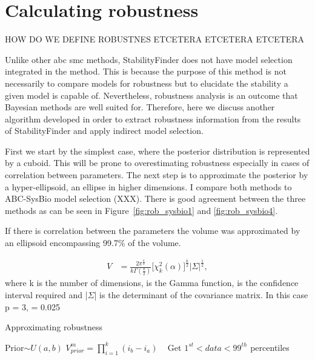 {\section{Calculating robustness}


{\color{red}HOW DO WE DEFINE ROBUSTNES ETCETERA ETCETERA ETCETERA }

Unlike other \acrshort{abc} \acrshort{smc} methods, StabilityFinder does not have model selection integrated in the method. This is because the purpose of this method is not necessarily to compare models for robustness but to elucidate the stability a given model is capable of. Nevertheless, robustness analysis is an outcome that Bayesian methods are well suited for. Therefore, here we discuss another algorithm developed in order to extract robustness information from the results of StabilityFinder and apply indirect model selection.  

 First we start by the simplest case, where the posterior distribution is represented by a cuboid. This will be prone to overestimating robustness especially in cases of correlation between parameters. The next step is to approximate the posterior by a hyper-ellipsoid, an ellipse in higher dimensions. I compare both methods to  ABC-SysBio model selection (XXX). There is good agreement between the three methods as can be seen in Figure~\ref{fig:rob_sysbio1} and \ref{fig:rob_sysbio4}.
 
 
 If there is correlation between the parameters the volume was approximated by an ellipsoid encompassing 99.7\% of the volume.

\begin{align}
	V & = \frac{2\pi^{\frac{k}{2}}}{k\Gamma(\frac{k}{2})} \Big[ \chi _{k}^{2}(\alpha) \Big]^{\frac{k}{2}} |\Sigma|^\frac{1}{2},
\end{align}
\noindent where k is the number of dimensions, \textGamma{} is the Gamma function, \textalpha{} is the confidence interval required and |$\Sigma$| is the determinant of the covariance matrix. In this case p = 3, \textalpha{} = 0.025

\begin{algorithm}[H]
	\label{alg:robustness}
  \caption{Approximating robustness}
 \begin{algorithmic}[1]
    \Statex
		\State Prior$\sim U(a, b)$
    	\State $V_{prior}^{m} = \prod_{i=1}^{k} (i_{b} - i_{a})$ \
		\Statex
			\State Get $1^{st} < data < 99^{th}$ percentiles
			
    		

\end{algorithmic}
\end{algorithm}}
